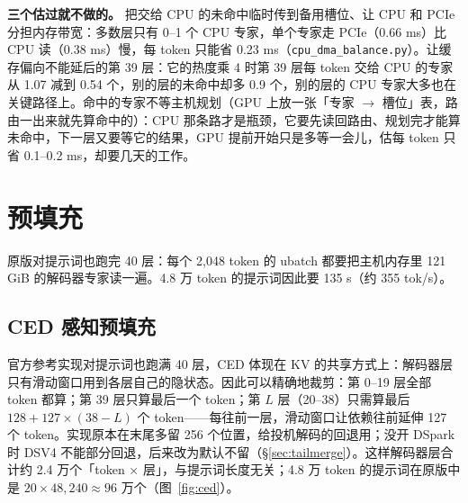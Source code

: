 \documentclass[11pt,a4paper]{article}
\newcommand{\code}[1]{\texttt{#1}}
\newcommand{\tps}{tok/s}
\begin{document}
\textbf{三个估过就不做的。} 把交给 CPU 的未命中临时传到备用槽位、让 CPU 和 PCIe 分担内存带宽：多数层只有 0--1 个 CPU 专家，单个专家走 PCIe（0.66 ms）比 CPU 读（0.38 ms）慢，每 token 只能省 0.23 ms（\code{cpu\_dma\_balance.py}）。让缓存偏向不能延后的第 39 层：它的热度乘 4 时第 39 层每 token 交给 CPU 的专家从 1.07 减到 0.54 个，别的层的未命中却多 0.9 个，别的层的 CPU 专家大多也在关键路径上。命中的专家不等主机规划（GPU 上放一张「专家 $\to$ 槽位」表，路由一出来就先算命中的）：CPU 那条路才是瓶颈，它要先读回路由、规划完才能算未命中，下一层又要等它的结果，GPU 提前开始只是多等一会儿，估每 token 只省 0.1--0.2 ms，却要几天的工作。

\section{预填充}
\label{sec:prefill}

原版对提示词也跑完 40 层：每个 2,048 token 的 ubatch 都要把主机内存里 121 GiB 的解码器专家读一遍。4.8 万 token 的提示词因此要 135 s（约 355 \tps{}）。

\subsection{CED 感知预填充}
\label{sec:ced}

官方参考实现对提示词也跑满 40 层，CED 体现在 KV 的共享方式上：解码器层只有滑动窗口用到各层自己的隐状态。因此可以精确地裁剪：第 0--19 层全部 token 都算；第 39 层只算最后一个 token；第 $L$ 层（20--38）只需算最后 $128 + 127 \times (38-L)$ 个 token——每往前一层，滑动窗口让依赖往前延伸 127 个 token。实现原本在末尾多留 256 个位置，给投机解码的回退用；没开 DSpark 时 DSV4 不能部分回退，后来改为默认不留（\S\ref{sec:tailmerge}）。这样解码器层合计约 2.4 万个「token × 层」，与提示词长度无关；4.8 万 token 的提示词在原版中是 $20 \times 48{,}240 \approx 96$ 万个（图~\ref{fig:ced}）。
\end{document}
